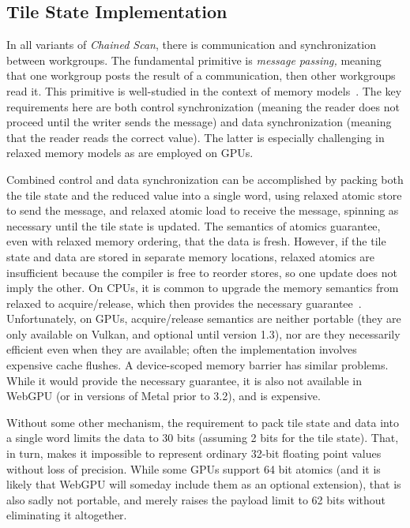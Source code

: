 \documentclass[sigconf,screen]{acmart}
\begin{document}
\subsection{Tile State Implementation}
In all variants of \emph{Chained Scan}, there is communication and synchronization between workgroups. The fundamental primitive is \emph{message passing,} meaning that one workgroup posts the result of a communication, then other workgroups read it. This primitive is well-studied in the context of memory models~\cite{Alglave0, MCMutants}. The key requirements here are both control synchronization (meaning the reader does not proceed until the writer sends the message) and data synchronization (meaning that the reader reads the correct value). The latter is especially challenging in relaxed memory models as are employed on GPUs.

Combined control and data synchronization can be accomplished by packing both the tile state and the reduced value into a single word, using relaxed atomic store to send the message, and relaxed atomic load to receive the message, spinning as necessary until the tile state is updated. The semantics of atomics guarantee, even with relaxed memory ordering, that the data is fresh. However, if the tile state and data are stored in separate memory locations, relaxed atomics are insufficient because the compiler is free to reorder stores, so one update does not imply the other. On CPUs, it is common to upgrade the memory semantics from relaxed to acquire/release, which then provides the necessary guarantee~\cite[Section 10.2]{intel_sdm_2024}. Unfortunately, on GPUs, acquire/release semantics are neither portable (they are only available on Vulkan, and optional until version 1.3), nor are they necessarily efficient even when they are available; often the implementation involves expensive cache flushes. A device-scoped memory barrier has similar problems. While it would provide the necessary guarantee, it is also not available in WebGPU (or in versions of Metal prior to 3.2), and is expensive.

Without some other mechanism, the requirement to pack tile state and data into a single word limits the data to 30 bits (assuming 2 bits for the tile state). That, in turn, makes it impossible to represent ordinary 32-bit floating point values without loss of precision. While some GPUs support 64 bit atomics (and it is likely that WebGPU will someday include them as an optional extension), that is also sadly not portable, and merely raises the payload limit to 62 bits without eliminating it altogether.
\end{document}
